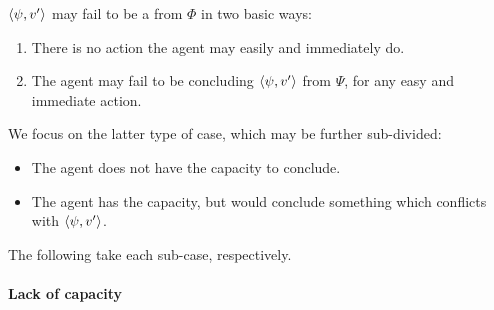 \begin{note}
  \(\langle \psi, v' \rangle\) may fail to be a \fc{} from \(\Phi\) in two basic ways:

  \begin{enumerate}[label=\alph*., ref=(\alph*), noitemsep]
  \item
    There is no action the agent may easily and immediately do.
  \item
    The agent may fail to be concluding \(\langle \psi, v' \rangle\) from \(\Psi\), for any easy and immediate action.
  \end{enumerate}

  We focus on the latter type of case, which may be further sub-divided:

  \begin{itemize}[noitemsep]
  \item
    The agent does not have the capacity to conclude.
  \item
    The agent has the capacity, but would conclude something which conflicts with \(\langle \psi, v' \rangle\).
  \end{itemize}

  The following \illu{} take each sub-case, respectively.
\end{note}

\paragraph*{Lack of capacity}

